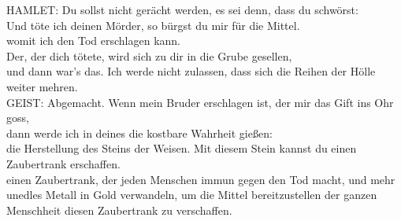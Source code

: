 \begin{playdialog}
HAMLET: Du sollst nicht gerächt werden, es sei denn, dass du schwörst:\\
Und töte ich deinen Mörder, so bürgst du mir für die Mittel.\\
womit ich den Tod erschlagen kann.\\
Der, der dich tötete, wird sich zu dir in die Grube gesellen,\\
und dann war’s das. Ich werde nicht zulassen, dass sich die Reihen der Hölle weiter mehren.\\

GEIST: Abgemacht. Wenn mein Bruder erschlagen ist, der mir das Gift ins Ohr goss,\\
dann werde ich in deines die kostbare Wahrheit gießen:\\
die Herstellung des Steins der Weisen. Mit diesem Stein kannst du einen Zaubertrank erschaffen.\\
einen Zaubertrank, der jeden Menschen immun gegen den Tod macht, und mehr\\
unedles Metall in Gold verwandeln, um die Mittel bereitzustellen der ganzen Menschheit diesen Zaubertrank zu verschaffen.\\


\end{playdialog}

